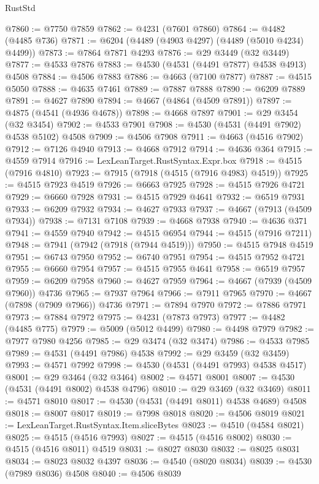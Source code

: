 \begin{lexlean}{RustStd}
\begin{coremodule}
@7860 := @7750 @7859
@7862 := @4231 (@7601 @7860)
@7864 := @4482 (@4485 @736)
@7871 := @6204 (@4489 (@4903 @4297) (@4489 (@5010 @4234) @4499))
@7873 := @7864 @7871 @4293
@7876 := @29 @3449 (@32 @3449)
@7877 := @4533 @7876
@7883 := @4530 (@4531 (@4491 @7877) @4538 @4913) @4508
@7884 := @4506 @7883
@7886 := @4663 (@7100 @7877)
@7887 := @4515 @5050
@7888 := @4635 @7461
@7889 := @7887 @7888
@7890 := @6209 @7889
@7891 := @4627 @7890
@7894 := @4667 (@4864 (@4509 @7891))
@7897 := @4875 (@4541 (@4936 @4678))
@7898 := @4668 @7897
@7901 := @29 @3454 (@32 @3454)
@7902 := @4533 @7901
@7908 := @4530 (@4531 (@4491 @7902) @4538 @5102) @4508
@7909 := @4506 @7908
@7911 := @4663 (@4516 @7902)
@7912 := @7126 @4940
@7913 := @4668 @7912
@7914 := @4636 @364
@7915 := @4559 @7914
@7916 := LexLeanTarget.RustSyntax.Expr.box
@7918 := @4515 (@7916 @4810)
@7923 := @7915 (@7918 (@4515 (@7916 @4983) @4519))
@7925 := @4515 @7923 @4519
@7926 := @6663 @7925
@7928 := @4515 @7926 @4721
@7929 := @6660 @7928
@7931 := @4515 @7929 @4641
@7932 := @6519 @7931
@7933 := @6209 @7932
@7934 := @4627 @7933
@7937 := @4667 (@7913 (@4509 @7934))
@7938 := @7131 @7108
@7939 := @4668 @7938
@7940 := @4636 @371
@7941 := @4559 @7940
@7942 := @4515 @6954
@7944 := @4515 (@7916 @7211)
@7948 := @7941 (@7942 (@7918 (@7944 @4519)))
@7950 := @4515 @7948 @4519
@7951 := @6743 @7950
@7952 := @6740 @7951
@7954 := @4515 @7952 @4721
@7955 := @6660 @7954
@7957 := @4515 @7955 @4641
@7958 := @6519 @7957
@7959 := @6209 @7958
@7960 := @4627 @7959
@7964 := @4667 (@7939 (@4509 @7960)) @4736
@7965 := @7937 @7964
@7966 := @7911 @7965
@7970 := @4667 (@7898 (@7909 @7966)) @4736
@7971 := @7894 @7970
@7972 := @7886 @7971
@7973 := @7884 @7972
@7975 := @4231 (@7873 @7973)
@7977 := @4482 (@4485 @775)
@7979 := @5009 (@5012 @4499)
@7980 := @4498 @7979
@7982 := @7977 @7980 @4256
@7985 := @29 @3474 (@32 @3474)
@7986 := @4533 @7985
@7989 := @4531 (@4491 @7986) @4538
@7992 := @29 @3459 (@32 @3459)
@7993 := @4571 @7992
@7998 := @4530 (@4531 (@4491 @7993) @4538 @4517)
@8001 := @29 @3464 (@32 @3464)
@8002 := @4571 @8001
@8007 := @4530 (@4531 (@4491 @8002) @4538 @4796)
@8010 := @29 @3469 (@32 @3469)
@8011 := @4571 @8010
@8017 := @4530 (@4531 (@4491 @8011) @4538 @4689) @4508
@8018 := @8007 @8017
@8019 := @7998 @8018
@8020 := @4506 @8019
@8021 := LexLeanTarget.RustSyntax.Item.sliceBytes
@8023 := @4510 (@4584 @8021)
@8025 := @4515 (@4516 @7993)
@8027 := @4515 (@4516 @8002)
@8030 := @4515 (@4516 @8011) @4519
@8031 := @8027 @8030
@8032 := @8025 @8031
@8034 := @8023 @8032 @4397
@8036 := @4540 (@8020 @8034)
@8039 := @4530 (@7989 @8036) @4508
@8040 := @4506 @8039

\end{coremodule}
\end{lexlean}
